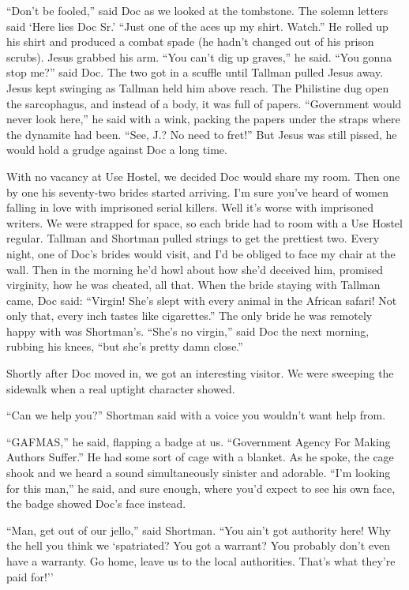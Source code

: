 \documentclass[oneside]{book}
\begin{document}
``Don't be fooled,'' said Doc as we looked at the tombstone.
The solemn letters said `Here lies Doc Sr.'  ``Just one of the aces up my shirt.
Watch.''  He rolled up his shirt and produced a combat spade (he hadn't changed
out of his prison scrubs).
Jesus grabbed his arm.  ``You can't dig up graves,'' he said.
``You gonna stop me?'' said Doc.  The two got in a scuffle until Tallman pulled Jesus
away.  Jesus kept swinging as Tallman held him above reach.
The Philistine dug open the sarcophagus,
and instead of a body, it was full of papers.  ``Government would never look
here,'' he said with a wink, packing the papers under the straps where the
dynamite had been.  ``See, J.?  No need to fret!''  But Jesus was
still pissed, he would hold a grudge against Doc a long time.

With no vacancy at Use Hostel, we decided Doc would share my room.
Then one by one his seventy-two brides started arriving.  I'm sure you've heard of
women falling in love with imprisoned serial killers.  Well it's
worse with imprisoned writers.  We were strapped for space, so each bride had to
room with a Use Hostel regular.  Tallman and
Shortman pulled strings to get the prettiest two.  Every night, one of Doc's
brides would visit, and I'd be obliged to face my chair at the wall.
Then in the morning he'd howl about how she'd deceived him, promised
virginity, how he was cheated, all that.  When the bride staying with Tallman
came, Doc said:  ``Virgin!  She's slept with every animal in the African safari!
Not only that, every inch tastes like cigarettes.''
The only bride he was remotely happy with was Shortman's.
``She's no virgin,'' said Doc the next morning, rubbing his knees,
``but she's pretty damn close.''

Shortly after Doc moved in, we got an interesting visitor.  We were sweeping the
sidewalk when a real uptight character showed.

``Can we help you?'' Shortman said with a voice you wouldn't want help from.

``GAFMAS,'' he said, flapping a badge at us.  ``Government Agency For
Making Authors Suffer.''  He had some sort of cage with a blanket.
As he spoke, the cage shook and we heard a sound simultaneously sinister
and adorable.  ``I'm looking for this man,'' he said, and sure enough, where you'd expect
to see his own face, the badge showed Doc's face instead.

``Man, get out of our jello,'' said Shortman.  ``You ain't got authority here!
Why the hell you think we `spatriated?  You got a warrant?  You probably don't even have a warranty.
Go home, leave us to the local authorities.  That's what they're paid for!''
\end{document}
